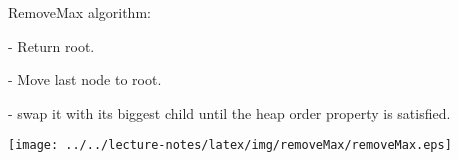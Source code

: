 \documentclass[a4paper, 10pt]{article}
\begin{document}
\begin{multicols}{2}
\begin{blackboard}
RemoveMax algorithm:

  - Return root.

  - Move last node to root.

  - swap it with its biggest child until the
    heap order property is satisfied.
\end{blackboard}
\columnbreak
\begin{center}
  \texttt{[image: ../../lecture-notes/latex/img/removeMax/removeMax.eps]}
\end{center}
\end{multicols}
\end{document}
